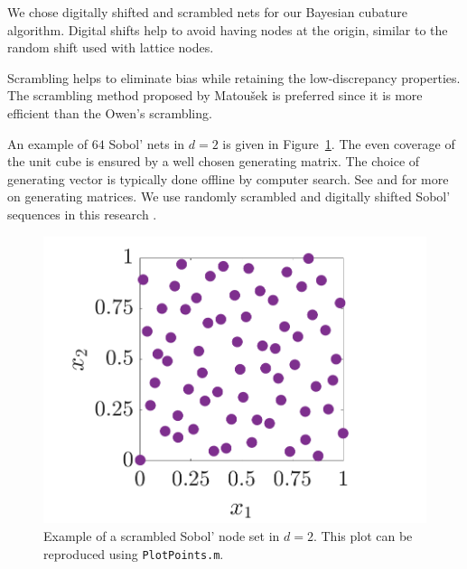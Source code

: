 \documentclass[graybox,footinfo]{svmult}
\newcommand{\bm}[1]{\boldsymbol{#1}}
\newcommand{\vx}{\bm{x}}
\newcommand{\vz}{\bm{z}}
\newcommand{\code}[1]{\texttt{#1}}
\newcommand\figref{Figure~\ref}
\newcommand{\JRNote}[1]{{\textcolor{green}{JR: #1}}}
\begin{document}
We chose digitally shifted and scrambled nets \cite{HicYue00} for our Bayesian cubature algorithm. Digital shifts help to avoid having nodes at the origin, similar to the random shift used with lattice nodes.

Scrambling helps to eliminate bias while retaining the low-discrepancy properties.
The scrambling method proposed by Matou\v{s}ek \cite{Mat98} is preferred since it is more efficient than the Owen's scrambling.

An example of $64$ Sobol' nets in $d=2$ is given in \figref{fig:sobol-fig}.  The even coverage of the unit cube is ensured by a well chosen generating matrix.  The choice of generating vector is typically done offline by computer search.  See \cite{KuoNuyens2016} and \cite{NuySoft} for more on generating matrices. We use randomly scrambled and digitally shifted Sobol' sequences in this research \cite{HonHic00a}. 

\begin{figure}[htp]
	\centering
	\includegraphics[width=0.8\linewidth]{figures/SSobolPoints}
	\caption{Example of a scrambled Sobol' node set  in $d=2$.  This plot can be reproduced using \code{PlotPoints.m}. }
	\label{fig:sobol-fig}
\end{figure}
\end{document}

